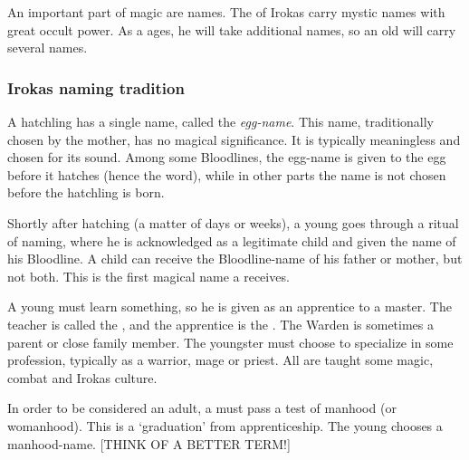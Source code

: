 An important part of \draconic{} magic are names. The \dragons{} of Irokas carry mystic names with great occult power. As a \dragon{} ages, he will take additional names, so an old \dragon{} will carry several names. 

\subsubsection{Irokas naming tradition}
A hatchling \dragon{} has a single name, called the \emph{egg-name}. This name, traditionally chosen by the mother, has no magical significance. It is typically meaningless and chosen for its sound. Among some Bloodlines, the egg-name is given to the egg before it hatches (hence the word), while in other parts the name is not chosen before the hatchling is born. 

Shortly after hatching (a matter of days or weeks), a young \dragon{} goes through a ritual of naming, where he is acknowledged as a legitimate child and given the name of his Bloodline. 
A child can receive the Bloodline-name of his father or mother, but not both. 
This is the first magical name a \dragon{} receives. 

A young \dragon{} must learn something, so he is given as an apprentice to a master. The teacher is called the , and the apprentice is the . The Warden is sometimes a parent or close family member. The youngster must choose to specialize in some profession, typically as a warrior, mage or priest. All \dragons{} are taught some magic, combat and Irokas culture. 

In order to be considered an adult, a \dragon{} must pass a test of manhood (or womanhood). This is a `graduation' from apprenticeship. The young \dragon{} chooses a manhood-name. [THINK OF A BETTER TERM!] 


